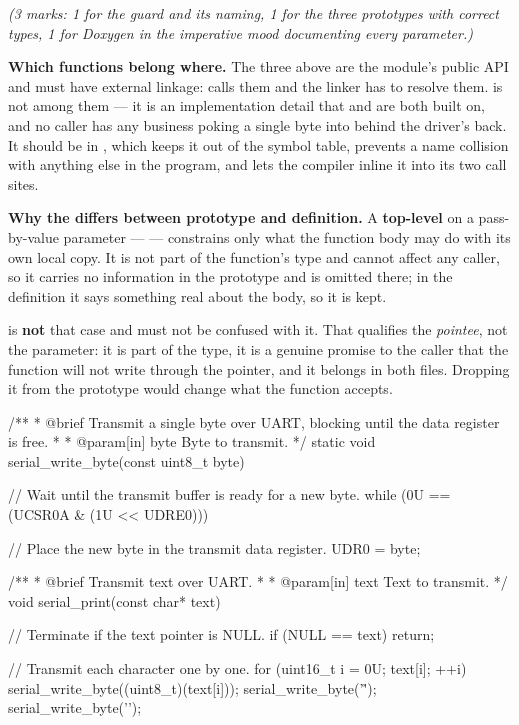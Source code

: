 {\itshape (3 marks: 1 for the guard and its naming, 1 for the three prototypes with correct types, 1
for Doxygen in the imperative mood documenting every parameter.)\par}

\medskip \textbf{Which functions belong where.} The three above are the module's public API and must
have external linkage:  calls them and the linker has to resolve them.
 is not among them --- it is an implementation detail that
 and  are both built on, and no caller has any business
poking a single byte into  behind the driver's back. It should be  in
, which keeps it out of the symbol table, prevents a name collision with anything
else in the program, and lets the compiler inline it into its two call sites. 

\textbf{Why the  differs between prototype and definition.} A \textbf{top-level}
 on a pass-by-value parameter ---  --- constrains only what the
function body may do with its own local copy. It is not part of the function's type and cannot
affect any caller, so it carries no information in the prototype and is omitted there; in the
definition it says something real about the body, so it is kept.

 is \textbf{not} that case and must not be confused with it. That
 qualifies the \emph{pointee}, not the parameter: it is part of the type, it is a
genuine promise to the caller that the function will not write through the pointer, and it belongs
in both files. Dropping it from the prototype would change what the function accepts. 

\begin{ccode}
/**
 * @brief Transmit a single byte over UART, blocking until the data register is free.
 *
 * @param[in] byte Byte to transmit.
 */
static void serial_write_byte(const uint8_t byte)
{
    // Wait until the transmit buffer is ready for a new byte.
    while (0U == (UCSR0A & (1U << UDRE0))) {}

    // Place the new byte in the transmit data register.
    UDR0 = byte;
}

/**
 * @brief Transmit text over UART.
 *
 * @param[in] text Text to transmit.
 */
void serial_print(const char* text)
{
    // Terminate if the text pointer is NULL.
    if (NULL == text) { return; }

    // Transmit each character one by one.
    for (uint16_t i = 0U; text[i]; ++i)
    {
        serial_write_byte((uint8_t)(text[i]));
    }
    serial_write_byte('\r');
    serial_write_byte('\n');
}
\end{ccode}

